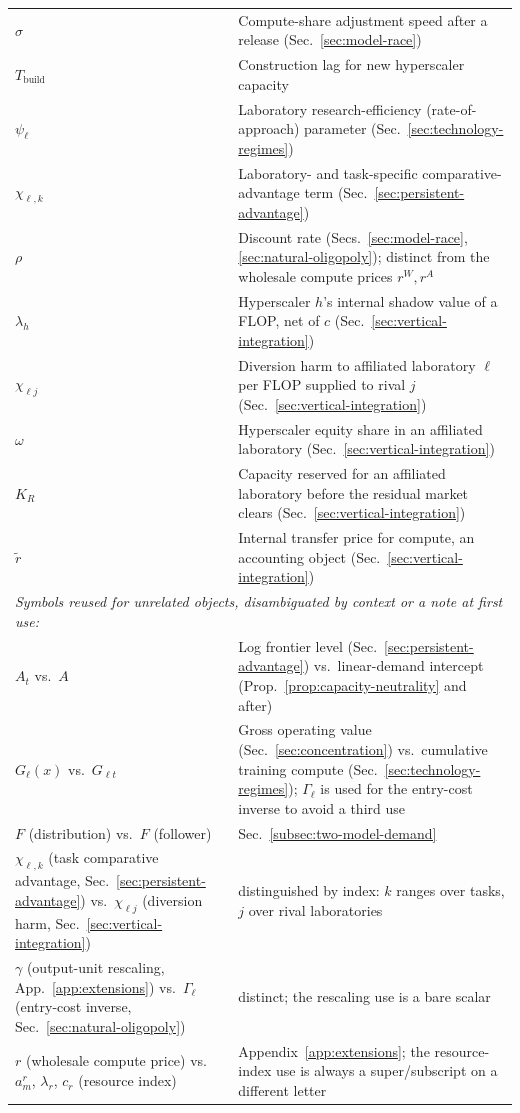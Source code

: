\documentclass[11pt]{article}
\begin{document}
\begin{table}[htbp]
\begin{tabular}{l>{\raggedright\arraybackslash}p{4.4in}}
$\sigma$ & Compute-share adjustment speed after a release (Sec.~\ref{sec:model-race}) \\
$T_{\mathrm{build}}$ & Construction lag for new hyperscaler capacity \\
$\psi_\ell$ & Laboratory research-efficiency (rate-of-approach) parameter (Sec.~\ref{sec:technology-regimes}) \\
$\chi_{\ell,k}$ & Laboratory- and task-specific comparative-advantage term (Sec.~\ref{sec:persistent-advantage}) \\
$\rho$ & Discount rate (Secs.~\ref{sec:model-race}, \ref{sec:natural-oligopoly}); distinct from the wholesale compute prices $r^W,r^A$ \\
$\lambda_h$ & Hyperscaler $h$'s internal shadow value of a FLOP, net of $c$ (Sec.~\ref{sec:vertical-integration}) \\
$\chi_{\ell j}$ & Diversion harm to affiliated laboratory $\ell$ per FLOP supplied to rival $j$ (Sec.~\ref{sec:vertical-integration}) \\
$\omega$ & Hyperscaler equity share in an affiliated laboratory (Sec.~\ref{sec:vertical-integration}) \\
$K_R$ & Capacity reserved for an affiliated laboratory before the residual market clears (Sec.~\ref{sec:vertical-integration}) \\
$\tilde r$ & Internal transfer price for compute, an accounting object (Sec.~\ref{sec:vertical-integration}) \\
\hline
\multicolumn{2}{l}{\emph{Symbols reused for unrelated objects, disambiguated by context or a note at first use:}} \\
$A_t$ vs.\ $A$ & Log frontier level (Sec.~\ref{sec:persistent-advantage}) vs.\ linear-demand intercept (Prop.~\ref{prop:capacity-neutrality} and after) \\
$G_\ell(x)$ vs.\ $G_{\ell t}$ & Gross operating value (Sec.~\ref{sec:concentration}) vs.\ cumulative training compute (Sec.~\ref{sec:technology-regimes}); $\Gamma_\ell$ is used for the entry-cost inverse to avoid a third use \\
$F$ (distribution) vs.\ $F$ (follower) & Sec.~\ref{subsec:two-model-demand} \\
$\chi_{\ell,k}$ (task comparative advantage, Sec.~\ref{sec:persistent-advantage}) vs.\ $\chi_{\ell j}$ (diversion harm, Sec.~\ref{sec:vertical-integration}) & distinguished by index: $k$ ranges over tasks, $j$ over rival laboratories \\
$\gamma$ (output-unit rescaling, App.~\ref{app:extensions}) vs.\ $\Gamma_\ell$ (entry-cost inverse, Sec.~\ref{sec:natural-oligopoly}) & distinct; the rescaling use is a bare scalar \\
$r$ (wholesale compute price) vs.\ $a_m^r$, $\lambda_r$, $c_r$ (resource index) & Appendix~\ref{app:extensions}; the resource-index use is always a super/subscript on a different letter \\
\hline
\end{tabular}
\end{table}
\end{document}
